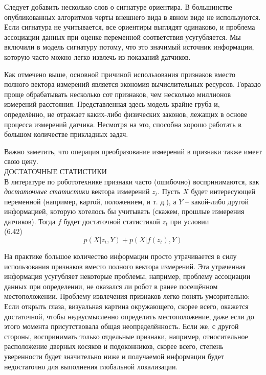 \documentclass[10pt,a4paper]{article}
\begin{document}
Следует добавить несколько слов о сигнатуре ориентира. В большинстве опубликованных алгоритмов черты внешнего вида в явном виде не используются. Если сигнатура не учитывается, все ориентиры выглядят одинаково, и проблема ассоциации данных при оценке переменной соответствия усугубляется. Мы включили в модель сигнатуру потому, что это значимый источник информации, которую часто можно легко извлечь из показаний датчиков. 

Как отмечено выше, основной причиной использования признаков вместо полного вектора измерений является экономия вычислительных ресурсов. Гораздо проще обрабатывать несколько сот признаков, чем несколько миллионов измерений расстояния. Представленная здесь модель крайне груба и, определённо, не отражает каких-либо физических законов, лежащих в основе процесса измерений датчика. Несмотря на это, способна хорошо работать в большом количестве прикладных задач. 

Важно заметить, что операция преобразование измерений в признаки также имеет свою цену.\\ ДОСТАТОЧНЫЕ СТАТИСТИКИ\\
В литературе по робототехнике признаки часто (ошибочно) воспринимаются, как \textit{достаточные статистики} вектора измерений $z_t$. Пусть $X$ будет интересующей переменной (например, картой, положением, и т. д.), а $Y$ – какой-либо другой информацией, которую хотелось бы учитывать (скажем, прошлые измерения датчиков). Тогда $f$ будет достаточной статистикой $z_t$ при условии\\

(6.42)
$$p(X|z_t,Y)+p(X|f(z_t),Y)$$

На практике большое количество информации просто утрачивается в силу использования признаков вместо полного вектора измерений. Эта утраченная информация усугубляет некоторые проблемы, например, проблему ассоциации данных при определении, не оказался ли робот в ранее посещённом местоположении. Проблему извлечения признаков легко понять умозрительно: Если открыть глаза, визуальная картина окружающего, скорее всего, окажется достаточной, чтобы недвусмысленно определить местоположение, даже если до этого момента присутствовала общая неопределённость. Если же, с другой стороны, воспринимать только отдельные признаки, например, относительное расположение дверных косяков и подоконников, скорее всего, степень уверенности будет значительно ниже и получаемой информации будет недостаточно для выполнения глобальной локализации. 
\end{document}
